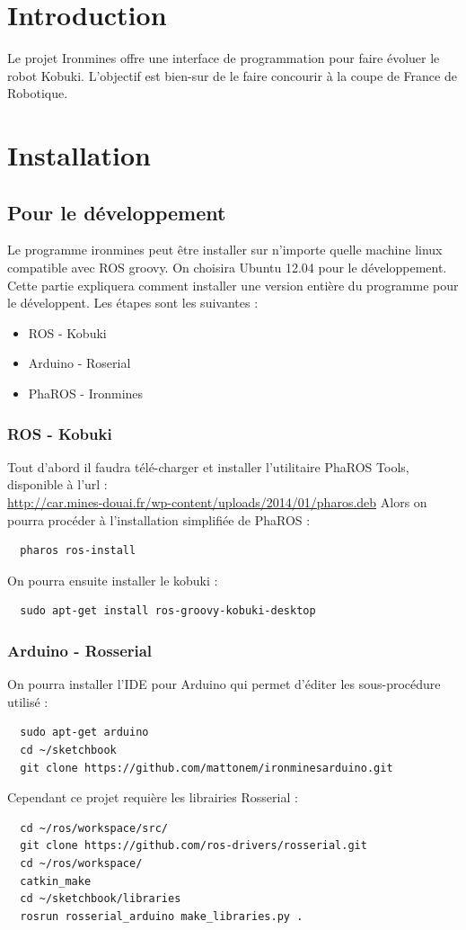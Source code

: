 \documentclass[a4paper, 11pt]{article}
\begin{document}
\section{Introduction}

Le projet Ironmines offre une interface de programmation pour faire
évoluer le robot Kobuki. L'objectif est bien-sur de le faire concourir
à la coupe de France de Robotique.

\section{Installation}
\subsection{Pour le développement}
Le programme ironmines peut être installer sur n'importe quelle machine
linux compatible avec ROS groovy. On choisira Ubuntu 12.04 pour le
développement. Cette partie expliquera comment installer une version
entière du programme pour le développent. Les étapes sont les
suivantes :
\begin{itemize}
\item ROS - Kobuki
\item Arduino - Roserial
\item PhaROS - Ironmines
\end{itemize}

\subsubsection{ROS - Kobuki}

Tout d'abord il faudra télé-charger et installer l'utilitaire PhaROS
Tools, disponible à l'url :\\
\url{http://car.mines-douai.fr/wp-content/uploads/2014/01/pharos.deb}
Alors on pourra procéder à l'installation simplifiée de PhaROS :

\begin{verbatim}
  pharos ros-install
\end{verbatim}
On pourra ensuite installer le kobuki :
\begin{verbatim}
  sudo apt-get install ros-groovy-kobuki-desktop
\end{verbatim}

\subsubsection{Arduino - Rosserial}

On pourra installer l'IDE pour Arduino qui permet d'éditer les
sous-procédure utilisé :
\begin{lstlisting}
  sudo apt-get arduino
  cd ~/sketchbook
  git clone https://github.com/mattonem/ironminesarduino.git
\end{lstlisting}
Cependant ce projet requière les librairies Rosserial :
\begin{lstlisting}
  cd ~/ros/workspace/src/
  git clone https://github.com/ros-drivers/rosserial.git
  cd ~/ros/workspace/
  catkin_make
  cd ~/sketchbook/libraries
  rosrun rosserial_arduino make_libraries.py .
\end{lstlisting}
\end{document}
